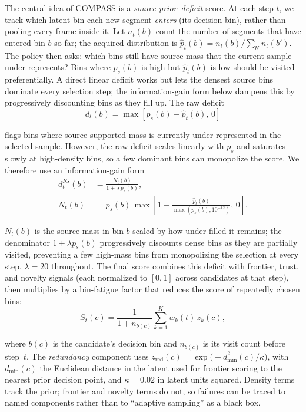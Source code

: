 The central idea of COMPASS is a \emph{source-prior--deficit} score.
At each step $t$, we track which latent bin each new segment \emph{enters} (its decision bin), rather than pooling every frame inside it.
Let $n_t(b)$ count the number of segments that have entered bin $b$ so far; the acquired distribution is $\hat{p}_t(b)=n_t(b)/\sum_{b'} n_t(b')$.
The policy then asks: which bins still have source mass that the current sample under-represents?
Bins where $p_s(b)$ is high but $\hat{p}_t(b)$ is low should be visited preferentially.
A direct linear deficit works but lets the densest source bins dominate every selection step; the information-gain form below dampens this by progressively discounting bins as they fill up. The raw deficit
\begin{equation}
    d_t(b) = \max\!\left[p_s(b) - \hat{p}_t(b),\,0\right]
    \label{eq:raw_deficit}
\end{equation}
flags bins where source-supported mass is currently under-represented in the selected sample. However, the raw deficit scales linearly with $p_s$ and saturates slowly at high-density bins, so a few dominant bins can monopolize the score. We therefore use an information-gain form
\begin{equation}
\begin{split}
    d^{IG}_t(b) &= \frac{N_t(b)}{1+\lambda\,p_s(b)},\\
    N_t(b) &= p_s(b)\,\max\!\left[1-\frac{\hat{p}_t(b)}{\max(p_s(b),10^{-12})},\,0\right].
\end{split}
    \label{eq:ig_deficit}
\end{equation}
$N_t(b)$ is the source mass in bin $b$ scaled by how under-filled it remains; the denominator $1+\lambda p_s(b)$ progressively discounts dense bins as they are partially visited, preventing a few high-mass bins from monopolizing the selection at every step. $\lambda=20$ throughout.
The final score combines this deficit with frontier, trust, and novelty signals (each normalized to $[0,1]$ across candidates at that step), then multiplies by a bin-fatigue factor that reduces the score of repeatedly chosen bins:
\begin{equation}
    S_t(c) = \frac{1}{1+n_{b(c)}}\sum_{k=1}^{K} w_k(t)\,z_k(c),
    \label{eq:score}
\end{equation}
\noindent
where $b(c)$ is the candidate's decision bin and $n_{b(c)}$ is its visit count before step~$t$.
The \emph{redundancy} component uses
$z_{\mathrm{red}}(c)=\exp\bigl(-d_{\min}^2(c)/\kappa\bigr)$,
with $d_{\min}(c)$ the Euclidean distance in the latent used for frontier scoring to the nearest prior decision point, and $\kappa=0.02$ in latent units squared.
Density terms track the prior; frontier and novelty terms do not, so failures can be traced to named components rather than to ``adaptive sampling'' as a black box.

